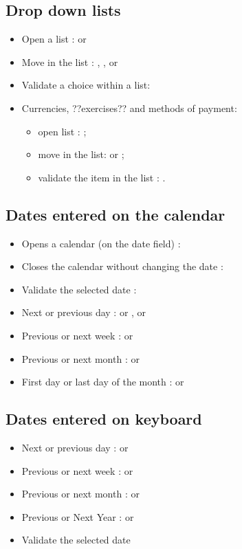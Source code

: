 \subsection{Drop down lists}

\begin{itemize}
	 \item Open a list :  or 
	 \item Move in the list : , ,  or 
	 \item Validate a choice within a list: 
	 \item Currencies, ??exercises?? and methods of payment:
		\begin{itemize}
			\item open list :  ; 
			\item move in the list:  or  ;
			\item validate the item in the list : .
		\end{itemize}
\end{itemize}


\subsection{Dates entered on the calendar}

\begin{itemize}
	\item Opens a calendar (on the date field) : 
	\item Closes the calendar without changing the date : 
	\item Validate the selected date : 
	\item Next or previous day : \key{+} or \key{-},  or 
	\item Previous or next week :  or 
	\item Previous or next month :  or 
	\item First day or last day of the month :  or 
\end{itemize}


\subsection{Dates entered on keyboard }

\begin{itemize}
	\item Next or previous day : \key{+} or \key{-}
	\item Previous or next week :  \key{+} or  \key{-}
	\item Previous or next month :  or 
	\item Previous or Next Year :   or  
	\item Validate the selected date 
\end{itemize}


